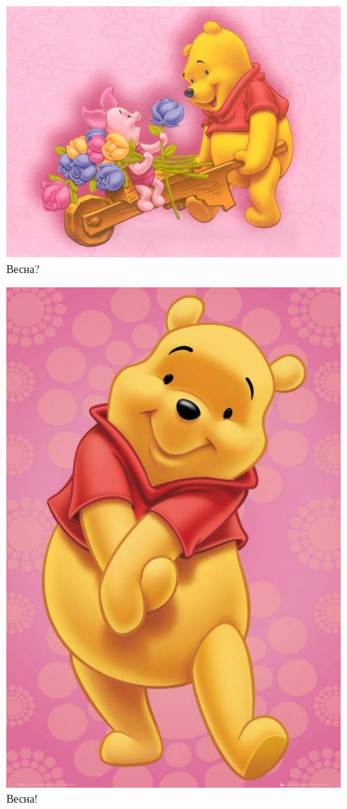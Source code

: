 \documentclass[12pt, a4paper]{article}
\theoremstyle{plain}              %
\theoremstyle{definition}         %
\begin{document}
\begin{figure}[H]
\includegraphics[scale=0.5]{w.jpg}
\caption{Весна?}
\end{figure}

\begin{figure}[H]
\begin{center}
\includegraphics[scale=0.5]{winni.jpg}
\caption{Весна!}
\end{center}
\end{figure}
\end{document}

